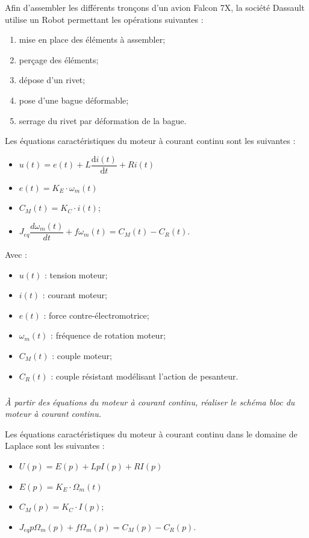 \documentclass[10pt,fleqn]{article} %
\begin{document}

\vspace{10cm}
\pagestyle{fancy}
\thispagestyle{plain}


\def\columnseprulecolor{\color{ocre}}
\setlength{\columnseprule}{0.4pt} 
\begin{multicols}{2}

Afin d'assembler les différents tronçons d'un avion Falcon 7X, la société Dassault utilise un Robot permettant les opérations suivantes :
\begin{enumerate}
\item mise en place des éléments à assembler;
\item perçage des éléments;
\item dépose d'un rivet;
\item pose d'une bague déformable;
\item serrage du rivet par déformation de la bague.
\end{enumerate}

\begin{obj} 

\end{obj}

Les équations caractéristiques du moteur à courant continu sont les suivantes : 
\begin{itemize}
\item $u(t)=e(t)+L\dfrac{\mathrm{d}i(t)}{\mathrm{d}t} + Ri(t)$
\item $e(t)=K_E \cdot \omega_m(t)$
\item $C_M(t)=K_C \cdot i(t)$;
\item $J_{eq}\dfrac{d\omega_m(t)}{dt} + f\omega_m(t) = C_M(t)-C_R(t)$.
\end{itemize}

Avec : 
\begin{itemize}
\item $u(t)$ : tension moteur;
\item $i(t)$ : courant moteur;
\item $e(t)$ : force contre-électromotrice;
\item $\omega_m(t)$ : fréquence de rotation moteur;
\item $C_M(t)$ : couple moteur;
\item $C_R(t)$ : couple résistant modélisant l'action de pesanteur.
\end{itemize}

\subparagraph{}
\textit{\`A partir des équations du moteur à courant continu, réaliser le schéma bloc du moteur à courant continu.}
\ifprof
\begin{corrige}
Les équations caractéristiques du moteur à courant continu dans le domaine de Laplace sont les suivantes : 
\begin{itemize}
\item $U(p)=E(p)+LpI(p) + RI(p)$
\item $E(p)=K_E \cdot \Omega_m(t)$
\item $C_M(p)=K_C \cdot I(p)$;
\item $J_{eq}p\Omega_m(p) + f\Omega_m(p) = C_M(p)-C_R(p)$.
\end{itemize}


\end{corrige}
\end{multicols}
\end{document}
